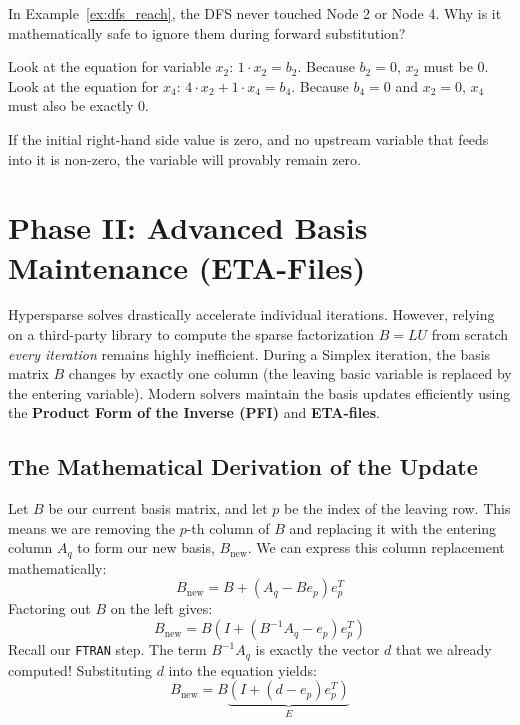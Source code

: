 \documentclass[11pt, a4paper]{article}
\begin{document}
\begin{note}
In Example~\ref{ex:dfs_reach}, the DFS never touched Node 2 or Node 4. Why is it mathematically safe to ignore them during forward substitution? 

Look at the equation for variable $x_2$: $1 \cdot x_2 = b_2$. Because $b_2 = 0$, $x_2$ must be $0$. 
Look at the equation for $x_4$: $4 \cdot x_2 + 1 \cdot x_4 = b_4$. Because $b_4 = 0$ and $x_2 = 0$, $x_4$ must also be exactly $0$. 

If the initial right-hand side value is zero, and no upstream variable that feeds into it is non-zero, the variable will provably remain zero. 
\end{note}

\section{Phase II: Advanced Basis Maintenance (ETA-Files)}

Hypersparse solves drastically accelerate individual iterations. However, relying on a third-party library to compute the sparse factorization $B = LU$ from scratch \emph{every iteration} remains highly inefficient. During a Simplex iteration, the basis matrix $B$ changes by exactly one column (the leaving basic variable is replaced by the entering variable). Modern solvers maintain the basis updates efficiently using the \textbf{Product Form of the Inverse (PFI)} and \textbf{ETA-files}.

\subsection{The Mathematical Derivation of the Update}

Let $B$ be our current basis matrix, and let $p$ be the index of the leaving row. This means we are removing the $p$-th column of $B$ and replacing it with the entering column $A_q$ to form our new basis, $B_{\text{new}}$. We can express this column replacement mathematically:
\[
B_{\text{new}} = B + (A_q - B e_p) e_p^T
\]
Factoring out $B$ on the left gives:
\[
B_{\text{new}} = B \left( I + (B^{-1}A_q - e_p) e_p^T \right)
\]
Recall our \texttt{FTRAN} step. The term $B^{-1}A_q$ is exactly the vector $d$ that we already computed! Substituting $d$ into the equation yields:
\[
B_{\text{new}} = B \underbrace{\left( I + (d - e_p) e_p^T \right)}_{E}
\]
\end{document}
